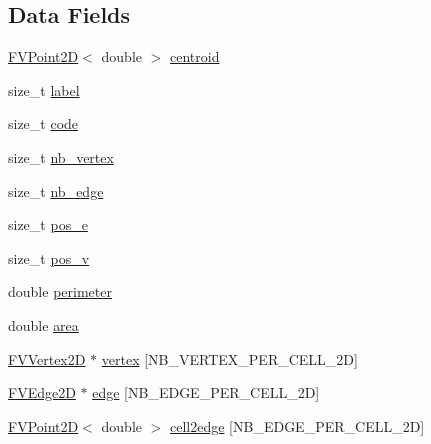 \subsection*{Data Fields}
\begin{DoxyCompactItemize}
\item 
\hyperlink{classFVPoint2D}{FVPoint2D}$<$ double $>$ \hyperlink{classFVCell2D_ab3ed78ad91cf05def39147f46817c454}{centroid}
\item 
size\_\-t \hyperlink{classFVCell2D_a1ec973463c76e6d9e91160720959ad68}{label}
\item 
size\_\-t \hyperlink{classFVCell2D_acf258c3b3328a96e3ee1e3b875b7874f}{code}
\item 
size\_\-t \hyperlink{classFVCell2D_a0a063e99fbc85e837d93dfbcda6f5252}{nb\_\-vertex}
\item 
size\_\-t \hyperlink{classFVCell2D_a71d1c26cc375a03060b9eb8453a3680a}{nb\_\-edge}
\item 
size\_\-t \hyperlink{classFVCell2D_a6320f7771a5dd32537e636a23fbf7e7c}{pos\_\-e}
\item 
size\_\-t \hyperlink{classFVCell2D_a9edf0688f0159bed5d3a6828f63146fd}{pos\_\-v}
\item 
double \hyperlink{classFVCell2D_a079d8fd569c3406fb63e0511eb0338c0}{perimeter}
\item 
double \hyperlink{classFVCell2D_ae517bffd82b9428b4f1d9500ea01c04f}{area}
\item 
\hyperlink{classFVVertex2D}{FVVertex2D} $\ast$ \hyperlink{classFVCell2D_a43af246790b321630c5b93c98d944c4e}{vertex} \mbox{[}NB\_\-VERTEX\_\-PER\_\-CELL\_\-2D\mbox{]}
\item 
\hyperlink{classFVEdge2D}{FVEdge2D} $\ast$ \hyperlink{classFVCell2D_aaef61084c7d087b06124b4e122b26eba}{edge} \mbox{[}NB\_\-EDGE\_\-PER\_\-CELL\_\-2D\mbox{]}
\item 
\hyperlink{classFVPoint2D}{FVPoint2D}$<$ double $>$ \hyperlink{classFVCell2D_a99bffb94997ba2dc39e4184c17166cce}{cell2edge} \mbox{[}NB\_\-EDGE\_\-PER\_\-CELL\_\-2D\mbox{]}
\end{DoxyCompactItemize}


